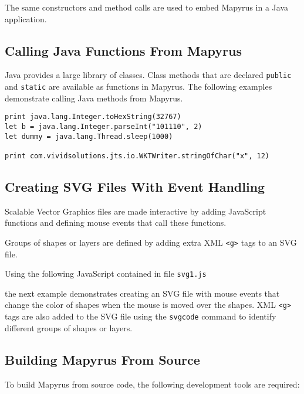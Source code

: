 The same constructors and method calls are used to embed
Mapyrus in a Java application.

\subsection{Calling Java Functions From Mapyrus}

Java provides a large library of classes.  Class methods that
are declared \texttt{public} and \texttt{static} are available
as functions in Mapyrus.
The following examples demonstrate calling Java methods from
Mapyrus.

\begin{verbatim}
print java.lang.Integer.toHexString(32767)
let b = java.lang.Integer.parseInt("101110", 2)
let dummy = java.lang.Thread.sleep(1000)

print com.vividsolutions.jts.io.WKTWriter.stringOfChar("x", 12)
\end{verbatim}

\subsection{Creating SVG Files With Event Handling}

Scalable Vector Graphics files are made interactive by
adding JavaScript functions and defining
mouse events that call these functions.

Groups of shapes or layers are defined by adding extra
XML \texttt{<g>} tags to an SVG file.

Using the following JavaScript contained in file \texttt{svg1.js}



the next example demonstrates creating an SVG file with
mouse events that change the color of shapes when the mouse is moved over
the shapes.
XML \texttt{<g>} tags are also added to the SVG file using the \texttt{svgcode}
command to
identify different groups of shapes or layers.



\subsection{Building Mapyrus From Source}

To build Mapyrus from source code, the following development tools
are required:

